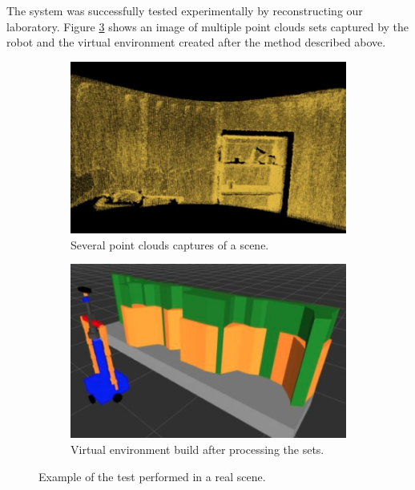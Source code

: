 \documentclass{llncs}
\begin{document}
The system was successfully tested experimentally by reconstructing our laboratory. Figure 
\ref{fig:SurfRecon} shows an image of multiple point clouds sets captured by the robot and the virtual environment created after the method described above.

\begin{figure}
	\centering
	\begin{subfigure}{0.49\textwidth}
		\includegraphics[width=\textwidth]{Figures/envReco1.png} 
		\caption{ Several point clouds captures of a scene.}
		\label{fig:SurfRecon1}
	\end{subfigure}
	\begin{subfigure}{0.49\textwidth}
		\includegraphics[width=\textwidth]{Figures/envReco2.png}
		\caption{Virtual environment build after processing the sets.}
		\label{fig:SurfRecon2}
	\end{subfigure}
	\caption{Example of the test performed in a real scene.}
	\label{fig:SurfRecon}
\end{figure}
\end{document}
